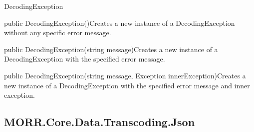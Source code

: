 \begin{class}{DecodingException}



    \begin{constructors}
        \begin{constructor}{public DecodingException()}{Creates a new instance of a DecodingException without any specific error message.}
        \end{constructor}
        \begin{constructor}{public DecodingException(string message)}{Creates a new instance of a DecodingException with the specified error message.}
            \begin{parameters}
            \end{parameters}
        \end{constructor}
        \begin{constructor}{public DecodingException(string message, Exception innerException)}{Creates a new instance of a DecodingException with the specified error message and inner exception.}
            \begin{parameters}
            \end{parameters}
        \end{constructor}
    \end{constructors}
\end{class}

\subsection*{MORR.Core.Data.Transcoding.Json}

